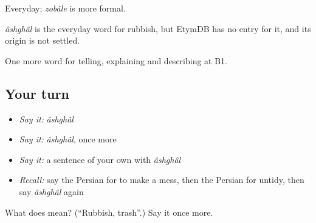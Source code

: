 Everyday; \emph{zobâle} is more formal.

\begin{cousinweb}
\emph{âshghâl} is the everyday word for rubbish, but EtymDB has no entry for it, and its origin is not settled.
\end{cousinweb}

\begin{grammarlens}[title={What you've built}]
One more word for telling, explaining and describing at B1.
\end{grammarlens}

\subsection*{Your turn}
\begin{itemize}
\raggedright
  \item \emph{Say it:} \emph{âshghâl}
  \item \emph{Say it:} \emph{âshghâl}, once more
  \item \emph{Say it:} a sentence of your own with \emph{âshghâl}
  \item \emph{Recall:} say the Persian for to make a mess, then the Persian for untidy, then say \emph{âshghâl} again
\end{itemize}

\begin{tcolorbox}[breakable,colback=teal!4,colframe=teal!35!black,title={Before you move on}]
What does  mean? (\textquotedblleft{}Rubbish, trash\textquotedblright{}.) Say it once more.
\end{tcolorbox}
